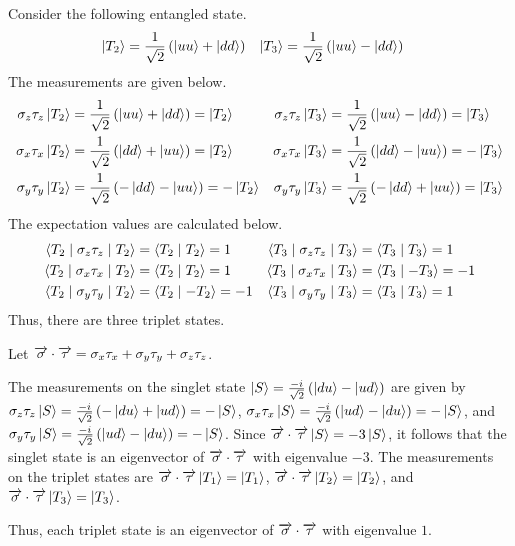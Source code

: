 \begin{answer}
	Consider the following entangled state.
	\begin{align}
		\ket{T_2} & = \frac{1}{\sqrt{2}} \left(\ket{u u} + \ket{d d}\right)
		          &
		\ket{T_3} & = \frac{1}{\sqrt{2}} \left(\ket{u u} - \ket{d d}\right)
	\end{align}
	The measurements are given below.
	\begin{align*}
		\sigma_z \tau_z \ket{T_2} & = \frac{1}{\sqrt{2}} \left(\ket{u u} + \ket{d d}\right) = \ket{T_2}    &
		\sigma_z \tau_z \ket{T_3} & = \frac{1}{\sqrt{2}} \left(\ket{u u} - \ket{d d}\right) = \ket{T_3}                                                                                                        \\
		\sigma_x \tau_x \ket{T_2} & = \frac{1}{\sqrt{2}} \left(\ket{d d} + \ket{u u}\right) = \ket{T_2}    & \sigma_x \tau_x \ket{T_3} & = \frac{1}{\sqrt{2}} \left(\ket{d d} - \ket{u u}\right) = - \ket{T_3} \\
		\sigma_y \tau_y \ket{T_2} & = \frac{1}{\sqrt{2}} \left(-\ket{d d} - \ket{u u}\right) = - \ket{T_2} & \sigma_y \tau_y \ket{T_3} & = \frac{1}{\sqrt{2}} \left(-\ket{d d} + \ket{u u}\right) = \ket{T_3}
	\end{align*}
	The expectation values are calculated below.
	\begin{align*}
		\braket{T_2 \mid \sigma_z \tau_z \mid T_2} & = \braket{T_2 \mid T_2} = 1   &
		\braket{T_3 \mid \sigma_z \tau_z \mid T_3} & = \braket{T_3 \mid T_3} = 1     \\
		\braket{T_2 \mid \sigma_x \tau_x \mid T_2} & = \braket{T_2 \mid T_2} = 1   &
		\braket{T_3 \mid \sigma_x \tau_x \mid T_3} & = \braket{T_3 \mid -T_3} = -1   \\
		\braket{T_2 \mid \sigma_y \tau_y \mid T_2} & = \braket{T_2 \mid -T_2} = -1 &
		\braket{T_3 \mid \sigma_y \tau_y \mid T_3} & = \braket{T_3 \mid T_3} = 1
	\end{align*}
	Thus, there are three triplet states.
\end{answer}

\begin{answer}
	Let $\overrightarrow{\sigma} \cdot \overrightarrow{\tau} = \sigma_x \tau_x + \sigma_y \tau_y + \sigma_z \tau_z$.

	The measurements on the singlet state $\ket{S} = \frac{-i}{\sqrt{2}} \left(\ket{d u} - \ket{u d}\right)$ are given by $\sigma_z \tau_z \ket{S} = \frac{-i}{\sqrt{2}}\left(-\ket{d u} + \ket{u d}\right) = - \ket{S}$, $\sigma_x \tau_x \ket{S} = \frac{-i}{\sqrt{2}}\left(\ket{u d} - \ket{d u}\right) = -\ket{S}$, and $\sigma_y \tau_y \ket{S} = \frac{-i}{\sqrt{2}} \left(\ket{u d} - \ket{d u}\right) = - \ket{S}$.
	Since $\overrightarrow{\sigma} \cdot \overrightarrow{\tau} \ket{S} = - 3 \ket{S}$, it follows that the singlet state is an eigenvector of $\overrightarrow{\sigma} \cdot \overrightarrow{\tau}$ with eigenvalue $-3$.
	The measurements on the triplet states are $\overrightarrow{\sigma} \cdot \overrightarrow{\tau} \ket{T_1} = \ket{T_1}$, $\overrightarrow{\sigma} \cdot \overrightarrow{\tau} \ket{T_2} = \ket{T_2}$, and $\overrightarrow{\sigma} \cdot \overrightarrow{\tau} \ket{T_3} = \ket{T_3}$.

	Thus, each triplet state is an eigenvector of $\overrightarrow{\sigma} \cdot \overrightarrow{\tau}$ with eigenvalue $1$.
\end{answer}

